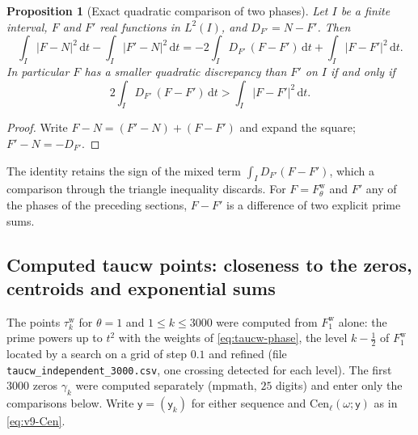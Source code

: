 \documentclass[11pt,a4paper]{article}
\numberwithin{equation}{section}
\newtheorem{proposition}[theorem]{Proposition}
\theoremstyle{definition}
\theoremstyle{remark}
\newcommand{\dd}{\,\mathrm dt}
\begin{document}
\begin{proposition}[Exact quadratic comparison of two phases]\label{prop:taucw-polar}
Let $I$ be a finite interval, $F$ and $F'$ real functions in $L^2(I)$, and $D_{F'}=N-F'$. Then
\begin{equation}\label{eq:taucw-polar}
\int_I|F-N|^2\dd-\int_I|F'-N|^2\dd=-2\int_ID_{F'}\,(F-F')\dd+\int_I|F-F'|^2\dd .
\end{equation}
In particular $F$ has a smaller quadratic discrepancy than $F'$ on $I$ if and only if
\begin{equation}\label{eq:taucw-polar-crit}
2\int_ID_{F'}\,(F-F')\dd>\int_I|F-F'|^2\dd .
\end{equation}
\end{proposition}
\begin{proof}
Write $F-N=(F'-N)+(F-F')$ and expand the square; $F'-N=-D_{F'}$.
\end{proof}
The identity retains the sign of the mixed term $\int_ID_{F'}(F-F')$, which a comparison through the triangle inequality discards. For $F=F^{\mathrm w}_\theta$ and $F'$ any of the phases of the preceding sections, $F-F'$ is a difference of two explicit prime sums.

\subsection{Computed taucw points: closeness to the zeros, centroids and exponential sums}\label{sec:taucw-data}
The points $\tau_k^{\mathrm w}$ for $\theta=1$ and $1\le k\le3000$ were computed from $F^{\mathrm w}_1$ alone: the prime powers up to $t^2$ with the weights of \eqref{eq:taucw-phase}, the level $k-\frac12$ of $F^{\mathrm w}_1$ located by a search on a grid of step $0.1$ and refined (file \texttt{taucw\_independent\_3000.csv}, one crossing detected for each level). The first $3000$ zeros $\gamma_k$ were computed separately (mpmath, $25$ digits) and enter only the comparisons below. Write $\mathsf y=(\mathsf y_k)$ for either sequence and $\mathrm{Cen}_\ell(\omega;\mathsf y)$ as in \eqref{eq:v9-Cen}.
\end{document}
